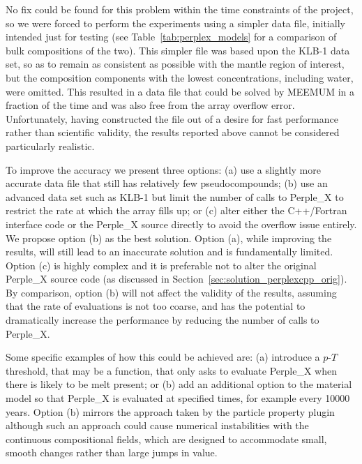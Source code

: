 No fix could be found for this problem within the time constraints of the project, so we were forced to perform the experiments using a simpler data file, initially intended just for testing (see Table~\ref{tab:perplex_models} for a comparison of bulk compositions of the two).
This simpler file was based upon the KLB-1 data set, so as to remain as consistent as possible with the mantle region of interest, but the composition components with the lowest concentrations, including water, were omitted.
This resulted in a data file that could be solved by MEEMUM in a fraction of the time and was also free from the array overflow error.
Unfortunately, having constructed the file out of a desire for fast performance rather than scientific validity, the results reported above cannot be considered particularly realistic.

To improve the accuracy we present three options: 
(a) use a slightly more accurate data file that still has relatively few pseudocompounds; 
(b) use an advanced data set such as KLB-1 but limit the number of calls to Perple\_X to restrict the rate at which the array fills up; 
or (c) alter either the C++/Fortran interface code or the Perple\_X source directly to avoid the overflow issue entirely.
We propose option (b) as the best solution.
Option (a), while improving the results, will still lead to an inaccurate solution and is fundamentally limited.
Option (c) is highly complex and it is preferable not to alter the original Perple\_X source code (as discussed in Section~\ref{sec:solution_perplexcpp_orig}).
By comparison, option (b) will not affect the validity of the results, assuming that the rate of evaluations is not too coarse, and has the potential to dramatically increase the performance by reducing the number of calls to Perple\_X.

Some specific examples of how this could be achieved are: 
(a) introduce a $p$-$T$ threshold, that may be a function, that only asks to evaluate Perple\_X when there is likely to be melt present; or
(b) add an additional option to the material model so that Perple\_X is evaluated at specified times, for example every \num{10000} years.
Option (b) mirrors the approach taken by the particle property plugin although such an approach could cause numerical instabilities with the continuous compositional fields, which are designed to accommodate small, smooth changes rather than large jumps in value.

\vspace{5mm}

